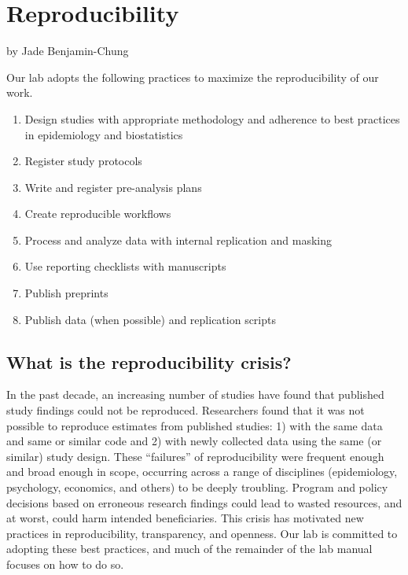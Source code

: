 \documentclass[
]{book}
\providecommand{\tightlist}{%
  \setlength{\itemsep}{0pt}\setlength{\parskip}{0pt}}
\begin{document}
\chapter{Reproducibility}\label{reproducibility}

by Jade Benjamin-Chung

Our lab adopts the following practices to maximize the reproducibility of our work.

\begin{enumerate}
\def\labelenumi{\arabic{enumi}.}
\tightlist
\item
  Design studies with appropriate methodology and adherence to best practices in epidemiology and biostatistics
\item
  Register study protocols
\item
  Write and register pre-analysis plans
\item
  Create reproducible workflows
\item
  Process and analyze data with internal replication and masking
\item
  Use reporting checklists with manuscripts
\item
  Publish preprints
\item
  Publish data (when possible) and replication scripts
\end{enumerate}

\section{What is the reproducibility crisis?}\label{what-is-the-reproducibility-crisis}

In the past decade, an increasing number of studies have found that published study findings could not be reproduced. Researchers found that it was not possible to reproduce estimates from published studies: 1) with the same data and same or similar code and 2) with newly collected data using the same (or similar) study design. These ``failures'' of reproducibility were frequent enough and broad enough in scope, occurring across a range of disciplines (epidemiology, psychology, economics, and others) to be deeply troubling. Program and policy decisions based on erroneous research findings could lead to wasted resources, and at worst, could harm intended beneficiaries. This crisis has motivated new practices in reproducibility, transparency, and openness. Our lab is committed to adopting these best practices, and much of the remainder of the lab manual focuses on how to do so.
\end{document}
